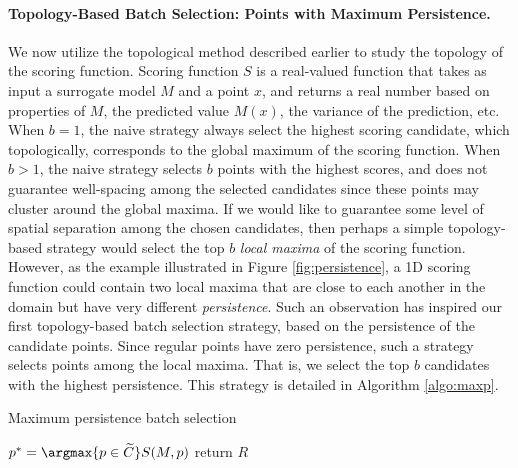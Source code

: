 \paragraph{Topology-Based Batch Selection: Points with Maximum Persistence.}
\label{subsection:topology-maxp}

We now utilize the topological method described earlier to study the topology of the scoring function.
%
Scoring function $S$ is a real-valued function that takes as input a surrogate model $M$ and a point $x$, and returns a real number based on properties of $M$, the predicted value $M(x)$, the variance of the prediction, etc.
%
When $b = 1$, the naive strategy always select the highest scoring candidate, which topologically, corresponds to the global maximum of the scoring function.
%
When $b > 1$, the naive strategy selects $b$ points with the highest scores, and does not guarantee well-spacing among the selected candidates since these points may cluster around the global maxima.
%
If we would like to guarantee some level of spatial separation among the chosen candidates, then perhaps a simple topology-based strategy would select the top $b$ \emph{local maxima} of the scoring function.
%
However, as the example illustrated in Figure \ref{fig:persistence},  a 1D scoring function could contain two local maxima that are close to each another in the domain but have very different \emph{persistence}.
%
Such an observation has inspired our first topology-based batch selection strategy,  based on the persistence of the candidate points.
%
Since regular points have zero persistence, such a strategy selects points among the local maxima.
%
That is, we select the top $b$ candidates with the highest persistence.
%
This strategy is detailed in Algorithm \ref{algo:maxp}.

{\fontsize{10}{10}\selectfont
\begin{algorithm}
\scriptsize
\caption{Maximum persistence batch selection}
\label{algo:maxp}
\begin{algorithmic}
  \State $p^* = \argmax{p \in \widetilde{C}} S(M, p)$
\EndWhile
{}
\State return $R$
\EndProcedure
\end{algorithmic}
\end{algorithm}
}

